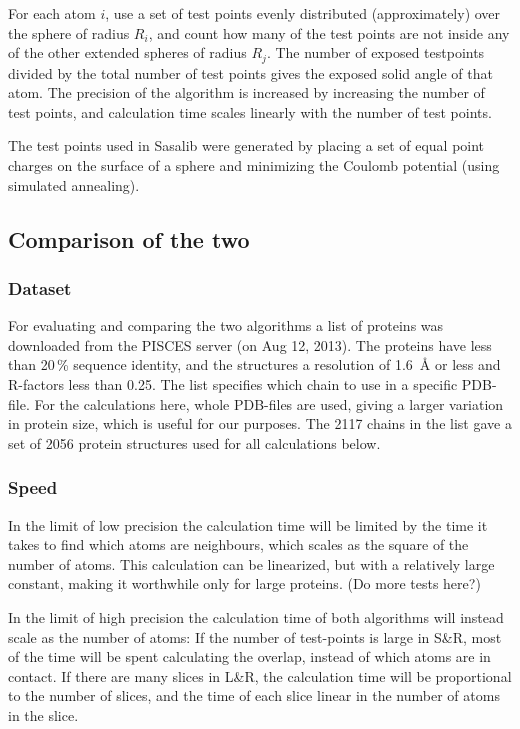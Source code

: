 \documentclass[a4paper,11pt]{article}
\begin{document}
For each atom $i$, use a set of test points evenly distributed
(approximately) over the sphere of radius $R_i$, and count how many of
the test points are not inside any of the other extended spheres of
radius $R_j$. The number of exposed testpoints divided by the total
number of test points gives the exposed solid angle of that atom. The
precision of the algorithm is increased by increasing the number of
test points, and calculation time scales linearly with the number of
test points.

The test points used in Sasalib were generated by placing a set of
equal point charges on the surface of a sphere and minimizing the Coulomb
potential (using simulated annealing).

\subsection{Comparison of the two}

\subsubsection{Dataset}

For evaluating and comparing the two algorithms a list of proteins was
downloaded from the PISCES server (on Aug 12, 2013). The proteins have
less than 20\,\% sequence identity, and the structures a resolution of
1.6~Å or less and R-factors less than 0.25. The list specifies which
chain to use in a specific PDB-file. For the calculations here, whole
PDB-files are used, giving a larger variation in protein size, which
is useful for our purposes. The 2117 chains in the list gave a set of
2056 protein structures used for all calculations below.

\subsubsection{Speed}

In the limit of low precision the calculation time will be limited by
the time it takes to find which atoms are neighbours, which scales as
the square of the number of atoms. This calculation can be linearized,
but with a relatively large constant, making it worthwhile only for
large proteins. (Do more tests here?)

In the limit of high precision the calculation time of both algorithms
will instead scale as the number of atoms: If the number of
test-points is large in S\&R, most of the time will be spent
calculating the overlap, instead of which atoms are in contact. If
there are many slices in L\&R, the calculation time will be
proportional to the number of slices, and the time of each
slice linear in the number of atoms in the slice. 
\end{document}
